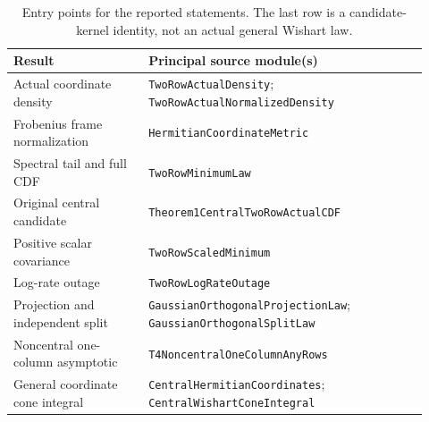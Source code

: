 \documentclass[11pt]{article}
\newcommand{\lean}[1]{{\small\nolinkurl{#1}}}
\begin{document}
\begin{table}[ht]
\centering\small
\begin{tabular}{>{\raggedright\arraybackslash}p{0.30\linewidth}>{\raggedright\arraybackslash}p{0.62\linewidth}}
\toprule Result & Principal source module(s)\\\midrule
Actual coordinate density & \lean{TwoRowActualDensity}; \lean{TwoRowActualNormalizedDensity}\\
Frobenius frame normalization & \lean{HermitianCoordinateMetric}\\
Spectral tail and full CDF & \lean{TwoRowMinimumLaw}\\
Original central candidate & \lean{Theorem1CentralTwoRowActualCDF}\\
Positive scalar covariance & \lean{TwoRowScaledMinimum}\\
Log-rate outage & \lean{TwoRowLogRateOutage}\\
Projection and independent split & \lean{GaussianOrthogonalProjectionLaw}; \lean{GaussianOrthogonalSplitLaw}\\
Noncentral one-column asymptotic & \lean{T4NoncentralOneColumnAnyRows}\\
General coordinate cone integral & \lean{CentralHermitianCoordinates}; \lean{CentralWishartConeIntegral}\\
\bottomrule
\end{tabular}
\caption{Entry points for the reported statements. The last row is a
candidate-kernel identity, not an actual general Wishart law.}\label{tab:map}
\end{table}
\end{document}
